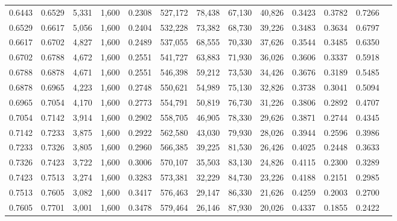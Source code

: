 \begin{tabular}{rrrrrrrrrrrrr}
0.6443 & 0.6529 &  5,331 & 1,600 &                                     0.2308 & 527,172 &  78,438 &  67,130 &  40,826 & 0.3423 & 0.3782 & 0.7266 \\
0.6529 & 0.6617 &  5,056 & 1,600 &                                     0.2404 & 532,228 &  73,382 &  68,730 &  39,226 & 0.3483 & 0.3634 & 0.6797 \\
0.6617 & 0.6702 &  4,827 & 1,600 &                                     0.2489 & 537,055 &  68,555 &  70,330 &  37,626 & 0.3544 & 0.3485 & 0.6350 \\
0.6702 & 0.6788 &  4,672 & 1,600 &                                     0.2551 & 541,727 &  63,883 &  71,930 &  36,026 & 0.3606 & 0.3337 & 0.5918 \\
0.6788 & 0.6878 &  4,671 & 1,600 &                                     0.2551 & 546,398 &  59,212 &  73,530 &  34,426 & 0.3676 & 0.3189 & 0.5485 \\
0.6878 & 0.6965 &  4,223 & 1,600 &                                     0.2748 & 550,621 &  54,989 &  75,130 &  32,826 & 0.3738 & 0.3041 & 0.5094 \\
0.6965 & 0.7054 &  4,170 & 1,600 &                                     0.2773 & 554,791 &  50,819 &  76,730 &  31,226 & 0.3806 & 0.2892 & 0.4707 \\
0.7054 & 0.7142 &  3,914 & 1,600 &                                     0.2902 & 558,705 &  46,905 &  78,330 &  29,626 & 0.3871 & 0.2744 & 0.4345 \\
0.7142 & 0.7233 &  3,875 & 1,600 &                                     0.2922 & 562,580 &  43,030 &  79,930 &  28,026 & 0.3944 & 0.2596 & 0.3986 \\
0.7233 & 0.7326 &  3,805 & 1,600 &                                     0.2960 & 566,385 &  39,225 &  81,530 &  26,426 & 0.4025 & 0.2448 & 0.3633 \\
0.7326 & 0.7423 &  3,722 & 1,600 &                                     0.3006 & 570,107 &  35,503 &  83,130 &  24,826 & 0.4115 & 0.2300 & 0.3289 \\
0.7423 & 0.7513 &  3,274 & 1,600 &                                     0.3283 & 573,381 &  32,229 &  84,730 &  23,226 & 0.4188 & 0.2151 & 0.2985 \\
0.7513 & 0.7605 &  3,082 & 1,600 &                                     0.3417 & 576,463 &  29,147 &  86,330 &  21,626 & 0.4259 & 0.2003 & 0.2700 \\
0.7605 & 0.7701 &  3,001 & 1,600 &                                     0.3478 & 579,464 &  26,146 &  87,930 &  20,026 & 0.4337 & 0.1855 & 0.2422 \\

\end{tabular}
